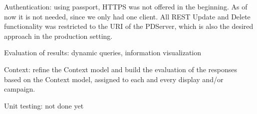 
		Authentication: using passport, HTTPS was not offered in the beginning. As of now it is not needed, since we only had one client. All REST Update and Delete functionality was restricted to the URI of the PDServer, which is also the desired approach in the production setting.

		Evaluation of results: dynamic queries, information visualization

		Context: refine the Context model and build the evaluation of the responses based on the Context model, assigned to each and every display and/or campaign.

		Unit testing: not done yet

